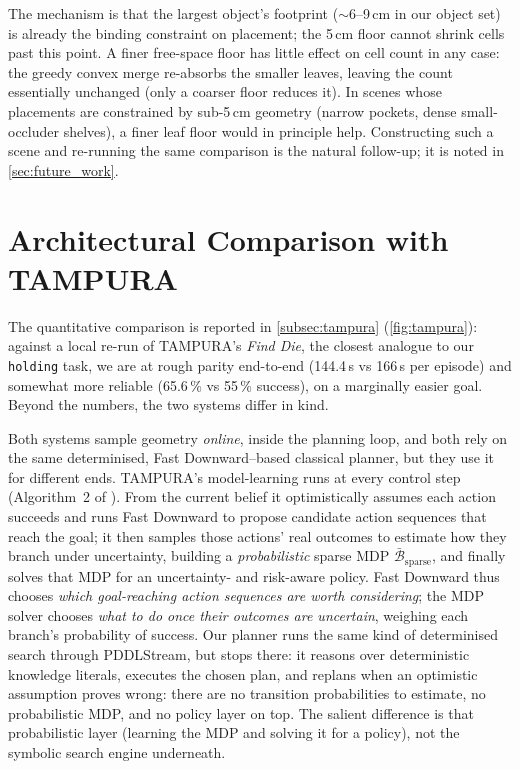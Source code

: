 The mechanism is that the largest object's footprint ($\sim$6--9\,cm in
our object set) is already the binding constraint on placement; the 5\,cm
floor cannot shrink cells past this point. A finer free-space floor has
little effect on cell count in any case: the greedy convex merge
re-absorbs the smaller leaves, leaving the count essentially unchanged
(only a coarser floor reduces it). In scenes whose placements are
constrained by sub-5\,cm geometry (narrow pockets, dense small-occluder
shelves), a finer leaf floor would in principle help. Constructing such
a scene and re-running the same comparison is the natural follow-up; it
is noted in \cref{sec:future_work}.

\section{Architectural Comparison with TAMPURA}
\label{sec:disc-tampura}

The quantitative comparison is reported in \cref{subsec:tampura}
(\cref{fig:tampura}): against a local re-run of TAMPURA's \emph{Find Die},
the closest analogue to our \texttt{holding} task, we are at rough
parity end-to-end (144.4\,s vs 166\,s per episode) and somewhat more
reliable (65.6\,\% vs 55\,\% success), on a marginally easier goal.
Beyond the numbers, the two systems differ in kind.

Both systems sample geometry \emph{online}, inside the planning loop, and
both rely on the same determinised, Fast Downward--based classical planner,
but they use it for different ends. TAMPURA's model-learning runs at
every control step (Algorithm~2 of \cite{curtis2024partially}). From the
current belief it optimistically assumes each action succeeds and runs
Fast Downward to propose candidate action sequences that reach the goal;
it then samples those actions' real outcomes to estimate how they branch
under uncertainty, building a \emph{probabilistic} sparse MDP
$\bar{\mathcal{B}}_\text{sparse}$, and finally solves that MDP
for an uncertainty- and risk-aware policy. Fast Downward thus chooses
\emph{which goal-reaching action sequences are worth considering}; the MDP
solver chooses \emph{what to do once their outcomes are uncertain}, weighing
each branch's probability of success. Our planner runs the same kind of
determinised search through PDDLStream, but stops there: it reasons over
deterministic knowledge literals, executes the chosen plan, and replans
when an optimistic assumption proves wrong: there are no transition
probabilities to estimate, no probabilistic MDP, and no policy layer on
top. The salient difference is that probabilistic layer (learning the
MDP and solving it for a policy), not the symbolic search
engine underneath.

